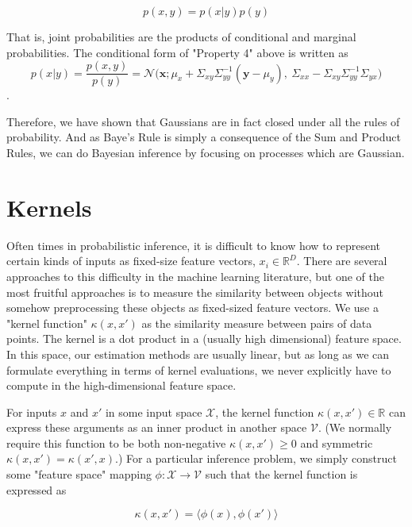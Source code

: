\documentclass[12pt]{article}
\begin{document}
\begin{equation}
p(x,y)=p(x|y)p(y)
\end{equation}

That is, joint probabilities are the products of conditional and marginal probabilities. The conditional form of "Property 4" above is written as
\begin{equation}
p(x|y)=\frac{p(x,y)}{p(y)}=\mathcal{N}\big(\textbf{x}; \mu_x+\Sigma_{xy}\Sigma^{-1}_{yy}(\textbf{y}-\mu_y), \ \Sigma_{xx}-\Sigma_{xy}\Sigma^{-1}_{yy}\Sigma_{yx}\big)
\end{equation}. 

Therefore, we have shown that Gaussians are in fact closed under all the rules of probability. And as Baye's Rule is simply a consequence of the Sum and Product Rules, we can do Bayesian inference by focusing on processes which are Gaussian.


\section{Kernels}

Often times in probabilistic inference, it is difficult to know how to represent certain kinds of inputs as fixed-size feature vectors, $x_i\in\mathbb{R}^{D}$. There are several approaches to this difficulty in the machine learning literature, but one of the most fruitful approaches is to measure the similarity between objects without somehow preprocessing these objects as fixed-sized feature vectors. We use a "kernel function"  $\kappa(x,x')$ as the similarity measure between pairs of data points. The kernel is a dot product in a (usually high dimensional) feature space. In this space, our estimation methods are usually linear, but as long as we can formulate everything in terms of kernel evaluations, we never explicitly have to compute in the high-dimensional feature space.

For inputs $x$ and $x'$ in some input space $\mathcal{X}$, the kernel function $\kappa(x,x')\in\mathbb{R}$ can express these arguments as an inner product in another space $\mathcal{V}$. (We normally require this function to be both non-negative $\kappa(x,x')\geq0$ and symmetric  $\kappa(x,x')=\kappa(x',x)$.) For a particular inference problem, we simply construct some "feature space" mapping $\phi: \mathcal{X}\rightarrow\mathcal{V}$ such that the kernel function is expressed as

\begin{equation}
\kappa(x,x')=\langle\phi(x), \phi(x')\rangle
\end{equation}
\end{document}
